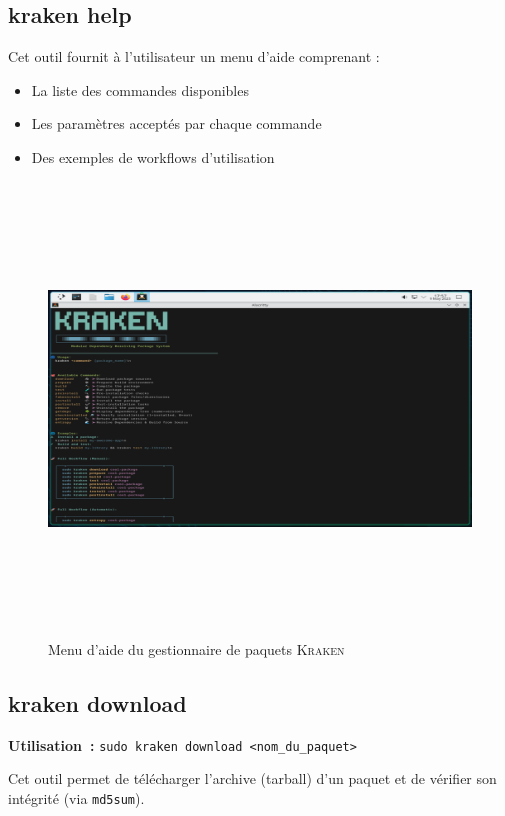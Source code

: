 \subsection{kraken help}
\label{subsec:kraken-help}

Cet outil fournit à l'utilisateur un menu d'aide comprenant :
\begin{itemize}
    \item La liste des commandes disponibles
    \item Les paramètres acceptés par chaque commande
    \item Des exemples de workflows d'utilisation

\end{itemize}

\begin{figure}[H]
  \centering
  \includegraphics[width=1\textwidth, height=12cm]{images_pfe/krakenhelpmenu.png}
  \caption{Menu d'aide du gestionnaire de paquets \textsc{Kraken}}
  \label{fig:kraken-help}
\end{figure} 

\subsection{kraken download}

\textbf{Utilisation :} \texttt{sudo kraken download <nom\_du\_paquet>}

Cet outil permet de télécharger l’archive (tarball) d’un paquet et de vérifier son intégrité (via \texttt{md5sum}).

